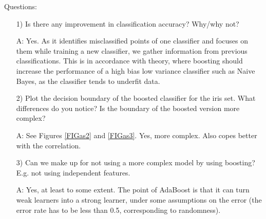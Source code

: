 \documentclass[a4paper,10pt]{article}
\begin{document}
\newpage
\noindent
Questions:
\begin{itemize}
  \item[1)] Is there any improvement in classification accuracy? Why/why not?
  \item[A:] Yes. As it identifies misclassified points of one classifier and focuses on them while training a new classifier, we gather information from previous classifications.  This is in accordance with theory, where boosting should increase the performance of a high bias low variance classifier such as Naive Bayes, as the classifier tends to underfit data.
  \item[2)] Plot the decision boundary of the boosted classifier for the iris set.
    What differences do you notice? Is the boundary of the boosted version more
    complex?
  \item[A:] See Figures \ref{FIGas2} and \ref{FIGas3}. Yes, more complex. Also copes better
    with the correlation.
  \item[3)] Can we make up for not using a more complex model by using boosting?
    E.g. not using independent features.
  \item[A:] Yes, at least to some extent. The point of AdaBoost is that it can turn weak learners into a strong learner, under some assumptions on the error (the error rate has to be less than 0.5, corresponding to randomness). 
\end{itemize}
\end{document}
